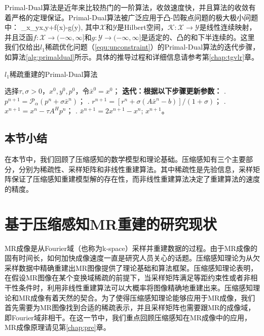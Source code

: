 Primal-Dual\cite{pd}算法是近年来比较热门的一阶算法，收敛速度快，并且算法的收敛有着严格的定理保证。Primal-Dual算法被广泛应用于凸-凹鞍点问题的极大极小问题中：
\beq
\min_{x\in{}}\max_{y\in{}}\quad\langle {}x,y\rangle+f(x)-g(y),
\label{equ:saddle1}
\eeq
其中$\mathcal{X}$和$\mathcal{Y}$是Hilbert空间，$\mathcal{K}:\mathcal{X}\rightarrow\mathcal{Y}$是线性连续映射，并且泛函$f:\mathcal{X}\rightarrow(-\infty,\infty]$和$g:\mathcal{Y}\rightarrow(-\infty,\infty]$是适定的、凸的和下半连续的。这里我们仅给出$l_1$稀疏优化问题（\ref{equ:unconstraint}）的Primal-Dual算法的迭代步骤，如算法\ref{alg:primaldual}所示。具体的推导过程和详细信息请参考第\ref{chap:tgvlr}章。
\begin{algorithm}
	\caption{$l_1$稀疏重建的Primal-Dual算法}
	\label{alg:primaldual}
	\begin{algorithmic}
		\REQUIRE 选择$\tau, \sigma>0$，$x^0,y^0,p^0$，令$\bar{x}^0=x^0$；
		\INDSTATE[-1.25] \textbf{迭代：根据以下步骤更新参数：}	
		. $p^{n+1}=\mathcal{P}_\alpha(p^n+\sigma\bar{x}^n)$；
		. $r^{n+1}=[r^n+\sigma(A\bar{x}^n-b)]/(1+\sigma)$；
		. $x^{n+1}=x^n-\tau A^Hp^n$；
		. $\bar{x}^{n+1}=2x^{n+1}-x^n$;
		\ENSURE $x^{n+1}$。
	\end{algorithmic}
\end{algorithm}

\subsection{本节小结}
在本节中，我们回顾了压缩感知的数学模型和理论基础。压缩感知有三个主要部分，分别为稀疏性、采样矩阵和非线性重建算法。其中稀疏性是先验信息，采样矩阵保证了压缩感知重建模型解的存在性，而非线性重建算法决定了重建算法的速度的精度。

\section{基于压缩感知MR重建的研究现状}
\label{sec:csmri}
MR成像是从Fourier域（也称为k-space）采样并重建数据的过程。由于MR成像的固有时间长，如何加快成像速度一直是研究人员关心的话题。压缩感知理论为从欠采样数据中精确重建出MR图像提供了理论基础和算法框架。压缩感知理论表明，在假设MR图像在某个变换域稀疏的前提下，当采样矩阵满足等距约束性或者非相干性条件时\cite{Donoho2006Compressed}，利用非线性重建算法可以大概率将图像精确地重建出来。压缩感知理论和MR成像有着天然的契合。为了使得压缩感知理论能够应用于MR成像，我们首先需要为MR图像找到合适的稀疏表示，并且采样矩阵也需要跟MR的成像域，即Fourier域非相干。在这一节中，我们重点回顾压缩感知在MR成像中的应用，MR成像原理请见第\ref{chap:pre}章。


